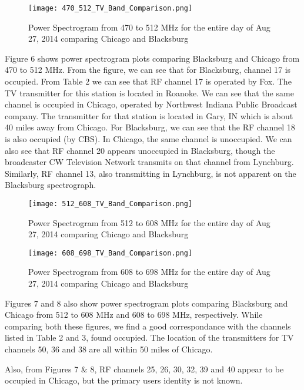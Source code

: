 \documentclass[12pt,sts]{report}
\begin{document}
	\begin{figure}[ht!]
		\centering
			\texttt{[image: 470\_512\_TV\_Band\_Comparison.png]}
		\caption{Power Spectrogram from 470 to 512 MHz for the entire day of Aug 27, 2014 comparing Chicago and Blacksburg}
	\end{figure}
	
	Figure 6 shows power spectrogram plots comparing Blacksburg and Chicago from 470 to 512 MHz. From the figure, we can see that for Blacksburg, channel 17 is occupied. From Table 2 we can see that RF channel 17 is operated by Fox. The TV transmitter for this station is located in Roanoke. We can see that the same channel is occupied in Chicago, operated by Northwest Indiana Public Broadcast company. The transmitter for that station is located in Gary, IN which is about 40 miles away from Chicago. 
	For Blacksburg, we can see that the RF channel 18 is also occupied (by CBS). In Chicago, the same channel is unoccupied. We can also see that RF channel 20 appears unoccupied in Blacksburg, though the broadcaster CW Television Network transmits on that channel from Lynchburg. Similarly, RF channel 13, also transmitting in Lynchburg, is not apparent on the Blacksburg spectrograph. 
	
	\begin{figure}[ht!]
		\centering
			\texttt{[image: 512\_608\_TV\_Band\_Comparison.png]}
		\caption{Power Spectrogram from 512 to 608 MHz for the entire day of Aug 27, 2014 comparing Chicago and Blacksburg}
	\end{figure}
	
	\begin{figure}[ht!]
		\centering
			\texttt{[image: 608\_698\_TV\_Band\_Comparison.png]}
		\caption{Power Spectrogram from 608 to 698 MHz for the entire day of Aug 27, 2014 comparing Chicago and Blacksburg}
	\end{figure}
	
	Figures 7 and 8 also show power spectrogram plots comparing Blacksburg and Chicago from 512 to 608 MHz and 608 to 698 MHz, respectively. While comparing both these figures, we find a good correspondance with the channels listed in Table 2 and 3, found occupied. The location of the transmitters for TV channels 50, 36 and 38 are all within 50 miles of Chicago.
	
	Also, from Figures 7 \& 8, RF channels 25, 26, 30, 32, 39 and 40 appear to be occupied in Chicago, but the primary users identity is not known.
	
\end{document}
